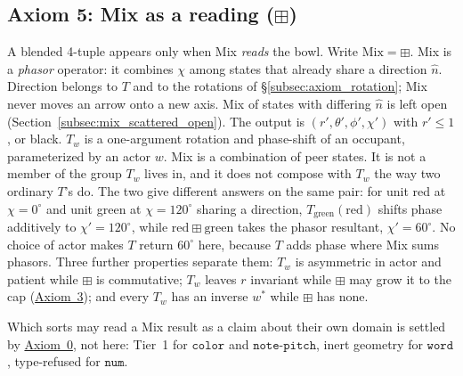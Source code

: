 \documentclass[12pt, a4paper]{article}
\begin{document}
\subsection{Axiom 5: Mix as a reading (\texorpdfstring{$\boxplus$}{boxplus})}
\label{subsec:axiom_interference}
A blended 4-tuple appears only when Mix \emph{reads} the bowl.
Write $\mathrm{Mix}=\boxplus$. Mix is a \emph{phasor} operator: it
combines $\chi$ among states that already share a direction $\hat n$.
Direction belongs to $T$ and to the rotations of
\S\ref{subsec:axiom_rotation}; Mix never moves an arrow onto a new
axis. Mix of states with differing $\hat n$ is left open
(Section~\ref{subsec:mix_scattered_open}). The output is
$(r',\theta',\phi',\chi')$ with $r'\le 1$, or black.
$T_w$ is a one-argument rotation and phase-shift of an occupant,
parameterized by an actor $w$. Mix is a combination of
peer states. It is not a member of the group $T_w$ lives in, and it
does not compose with $T_w$ the way two ordinary $T$'s do. The two
give different answers on the same pair: for unit red at $\chi=0^\circ$
and unit green at $\chi=120^\circ$ sharing a direction,
$T_{\mathrm{green}}(\mathrm{red})$ shifts phase additively to
$\chi'=120^\circ$, while $\mathrm{red}\boxplus\mathrm{green}$ takes the
phasor resultant, $\chi'=60^\circ$. No choice of actor makes $T$
return $60^\circ$ here, because $T$ adds phase where Mix sums phasors.
Three further properties separate them: $T_w$ is asymmetric in actor
and patient while $\boxplus$ is commutative; $T_w$ leaves $r$ invariant
while $\boxplus$ may grow it to the cap
(\hyperref[subsec:axiom_white]{Axiom~3}); and every $T_w$ has an inverse
$w^{*}$ while $\boxplus$ has none.

Which sorts may read a Mix result as a claim about their own domain is
settled by \hyperref[subsec:axiom0_admissibility]{Axiom~0}, not here: Tier~1
for $\mathtt{color}$ and $\mathtt{note\text{-}pitch}$, inert geometry
for $\mathtt{word}$, type-refused for $\mathtt{num}$.
\end{document}
